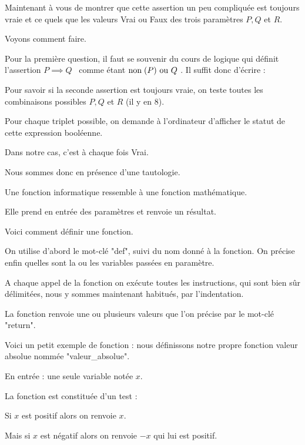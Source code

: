 Maintenant à vous de montrer que cette assertion un peu compliquée est toujours
vraie et ce quels que les valeurs Vrai ou Faux des trois paramètres $P,Q$ et $R$.

\change

Voyons comment faire.

Pour la première question, il faut se souvenir du cours de 
logique qui définit l'assertion
\og$P\implies Q$ \fg\ comme étant \og$\text{non\;}(P) \text{ ou } Q$ \fg.
Il suffit donc d'écrire : 

\change
Pour savoir si la seconde assertion est toujours vraie, 
on teste toutes les combinaisons possibles $P,Q$ et $R$ (il y en $8$).

Pour chaque triplet possible, on demande à l'ordinateur d'afficher le statut de cette expression booléenne.

Dans notre cas, c'est à chaque fois Vrai.

Nous sommes donc en présence d'une tautologie.

\diapo


\change

Une fonction informatique ressemble à une fonction mathématique.

Elle prend en entrée des paramètres
et renvoie un résultat.


Voici comment définir une fonction.

On utilise d'abord le mot-clé "def", 
suivi du nom donné à la fonction. On précise enfin quelles sont la ou les variables passées en paramètre.

A chaque appel de la fonction on exécute toutes les instructions, 
qui sont bien sûr délimitées, nous y sommes maintenant habitués, par l'indentation.


La fonction renvoie une ou plusieurs valeurs que l'on précise par le mot-clé 
"return".

\diapo

Voici un petit exemple de fonction :
nous définissons notre propre fonction valeur absolue nommée "valeur\_absolue".

En entrée : une seule variable notée $x$.

La fonction est constituée d'un test : 

Si $x$ est positif alors on renvoie $x$.

Mais si $x$ est négatif alors 
on renvoie $-x$ qui lui est positif.

